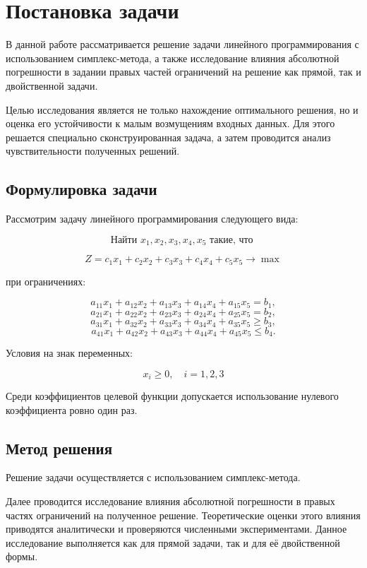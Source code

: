 \section{Постановка задачи}

В данной работе рассматривается решение задачи линейного программирования с использованием симплекс-метода, а также исследование влияния абсолютной погрешности в задании правых частей ограничений на решение как прямой, так и двойственной задачи.

Целью исследования является не только нахождение оптимального решения, но и оценка его устойчивости к малым возмущениям входных данных. Для этого решается специально сконструированная задача, а затем проводится анализ чувствительности полученных решений.

\subsection{Формулировка задачи}
Рассмотрим задачу линейного программирования следующего вида:

$$
\text{Найти } x_1, x_2, x_3, x_4, x_5 \text{ такие, что }
$$

$$
Z = c_1 x_1 + c_2 x_2 + c_3 x_3 + c_4 x_4 + c_5 x_5 \to \max
$$

при ограничениях:

$$
a_{11} x_1 + a_{12} x_2 + a_{13} x_3 + a_{14} x_4 + a_{15} x_5 = b_1,
$$
$$
a_{21} x_1 + a_{22} x_2 + a_{23} x_3 + a_{24} x_4 + a_{25} x_5 = b_2,
$$
$$
a_{31} x_1 + a_{32} x_2 + a_{33} x_3 + a_{34} x_4 + a_{35} x_5 \geq b_3,
$$
$$
a_{41} x_1 + a_{42} x_2 + a_{43} x_3 + a_{44} x_4 + a_{45} x_5 \leq b_4.
$$

Условия на знак переменных:

$$x_i \geq 0, \quad i = 1, 2, 3$$

Среди коэффициентов целевой функции допускается использование нулевого коэффициента ровно один раз.

\subsection{Метод решения}

Решение задачи осуществляется с использованием симплекс-метода. %

Далее проводится исследование влияния абсолютной погрешности в правых частях ограничений на полученное решение. Теоретические оценки этого влияния приводятся аналитически и проверяются численными экспериментами. Данное исследование выполняется как для прямой задачи, так и для её двойственной формы.

